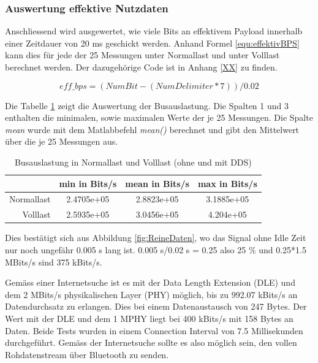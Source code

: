\subsubsection{Auswertung effektive Nutzdaten}
Anschliessend wird ausgewertet, wie viele Bits an effektivem Payload innerhalb einer Zeitdauer von 20 ms geschickt werden. Anhand Formel \ref{equ:effektivBPS} kann dies  für jede der 25 Messungen unter Normallast und unter Volllast berechnet werden.  Der dazugehörige Code ist in Anhang \textcolor{red}{\ref{XX}} zu finden.

\begin{equation}
    eff\_bps = (NumBit - (NumDelimiter * 7)) / 0.02
    \label{equ:effektivBPS}
\end{equation}


 Die Tabelle \ref{tab:Busauslastung} zeigt die Auswertung  der Busauslastung. Die Spalten 1 und 3 enthalten die minimalen, sowie maximalen Werte der je 25 Messungen. Die Spalte \textit{mean} wurde mit dem Matlabbefehl \textit{mean()} berechnet und gibt den Mittelwert über die je 25 Messungen aus. 

\begin{table}[H]
    \centering
    \begin{tabular}{r|c|c|c}
        & min in Bits/s & mean in Bits/s & max in Bits/s\\ 
        \hline
        Normallast & 2.4705e+05 & 2.8823e+05 & 3.1885e+05\\
        \hline
        Volllast & 2.5935e+05 & 3.0456e+05 & 4.204e+05 \\
    \end{tabular}
    \caption{Busauslastung in Normallast und Volllast (ohne und mit DDS) }
    \label{tab:Busauslastung}
\end{table}

Dies bestätigt sich aus Abbildung \ref{fig:ReineDaten}, wo das Signal ohne Idle Zeit nur noch ungefähr 0.005 s lang ist. 0.005 s/0.02 s = 0.25  also 25 \% und 0.25*1.5 MBits/s sind 375 kBits/s. 

Gemäss einer Internetsuche ist es mit der Data Length Extension (DLE) und dem 2 MBits/s physikalischen Layer (PHY) möglich, bis zu 992.07 kBits/s an Datendurchsatz zu erlangen. Dies bei einem Datenaustausch von 247 Bytes. Der Wert mit der DLE und dem 1 MPHY liegt bei 400 kBits/s mit 158 Bytes an Daten. Beide Tests wurden in einem Connection Interval von 7.5 Millisekunden durchgeführt. 
Gemäss der Internetsuche sollte es also möglich sein, den vollen Rohdatenstream über Bluetooth zu senden. 

